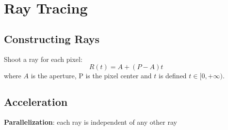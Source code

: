 \section{Ray Tracing}
\subsection{Constructing Rays}
Shoot a ray for each pixel:
\[
    R(t)=A+(P-A)t
\] where $A$ is the aperture, P is the pixel center and $t$ is defined  $t\in[0,+\infty)$.

\subsection{Acceleration}
\textbf{Parallelization}: each ray is independent of any other ray
